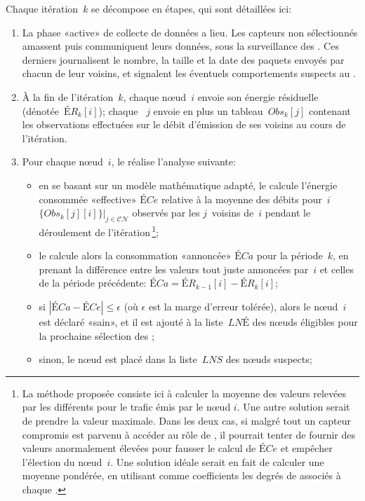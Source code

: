 Chaque itération~$k$ se décompose en étapes, qui sont détaillées ici:
\begin{enumerate}
    \item La phase «active» de collecte de données a lieu. Les capteurs non sélectionnés amassent puis communiquent leurs données, sous la surveillance des \cns. Ces derniers journalisent le nombre, la taille et la date des paquets envoyés par chacun de leur voisins, et signalent les éventuels comportements suspects au \ch.
    \item À la fin de l'itération~$k$, chaque nœud~$i$ envoie son énergie résiduelle (dénotée~$\mathit{ÉR}_k[i]$); chaque \cn~$j$ envoie en plus un tableau~$\mathit{Obs}_k[j]$ contenant les observations effectuées sur le débit d'émission de ses voisins au cours de l'itération.
    \item Pour chaque nœud~$i$, le \ch réalise l'analyse suivante:
        \begin{itemize}
            \item en se basant sur un modèle mathématique adapté, le \CH calcule l'énergie consommée «effective» $\mathit{ÉCe}$ relative à la moyenne des débits pour~$i$ $\{\mathit{Obs}_k[j][i]\}|_{j\in \mathcal{CN}}$ observés par les $j$~\cns voisins de~$i$ pendant le déroulement de l'itération\,\footnote{La méthode proposée consiste ici à calculer la moyenne des valeurs relevées par les différents \cns pour le trafic émis par le nœud $i$. Une autre solution serait de prendre la valeur maximale. Dans les deux cas, si malgré tout un capteur compromis est parvenu à accéder au rôle de \cn, il pourrait tenter de fournir des valeurs anormalement élevées pour fausser le calcul de $\mathit{ÉCe}$ et empêcher l'élection du nœud~$i$. Une solution idéale serait en fait de calculer une moyenne pondérée, en utilisant comme coefficients les degrés de  associés à chaque \cn.};
            \item le \CH calcule alors la consommation «annoncée» $\mathit{ÉCa}$ pour la période~$k$, en prenant la différence entre les valeurs tout juste annoncées par~$i$ et celles de la période précédente: $\mathit{ÉCa}=\mathit{ÉR}_{k-1}[i] - \mathit{ÉR}_k[i]$;
            \item si $|\mathit{ÉCa}-\mathit{ÉCe}|\leq\epsilon$ (où $\epsilon$ est la marge d'erreur tolérée), alors le nœud~$i$ est déclaré «sain», et il est ajouté à la liste~$\mathit{LNÉ}$ des nœuds éligibles pour la prochaine sélection des \cns;
            \item sinon, le nœud est placé dans la liste~$\mathit{LNS}$ des nœuds suspects;

\end{itemize}
\end{enumerate}
